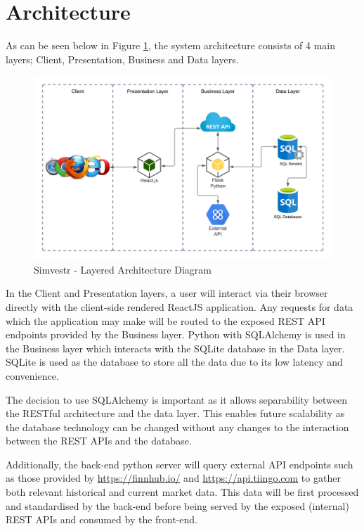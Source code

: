 
\section{Architecture}
\label{sec:arch}
As can be seen below in Figure \ref{fig:Architecture}, the system architecture consists of 4 main layers; Client, Presentation, Business and Data layers.

\begin{figure}[htp]
    \centering
    \includegraphics[scale = .7]{./5_architecture/Architecture.png}
    \caption{Simvestr - Layered Architecture Diagram}
    \label{fig:Architecture}
\end{figure}


In the Client and Presentation layers, a user will interact via their browser directly with the client-side rendered ReactJS application. Any requests for data which the application may make will be routed to the exposed REST API endpoints provided by the Business layer. Python with SQLAlchemy is used in the Business layer which interacts with the SQLite database in the Data layer. SQLite is used as the database to store all the data due to its low latency and convenience. 

The decision to use SQLAlchemy is important as it allows separability between the RESTful architecture and the data layer. This enables future scalability as the database technology can be changed without any changes to the interaction between the REST APIs and the database.

Additionally, the back-end python server will query external API endpoints such as those provided by \url{https://finnhub.io/} and \url{https://api.tiingo.com} to gather both relevant historical and current market data. This data will be first processed and standardised by the back-end before being served by the exposed (internal) REST APIs and consumed by the front-end.


